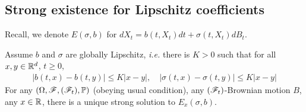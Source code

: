 \documentclass[10pt,a4paper]{article}
\begin{document}
\subsection{Strong existence for Lipschitz coefficients}

Recall, we denote $E(\sigma, b)$ for $dX_t = b(t, X_t) dt + \sigma(t, X_t) dB_t$.
\s

\thm Assume $b$ and $\sigma$ are globally Lipschitz, \textit{i.e.} there is $K>0$ such that for all $x,y\in \mathbb{R}^d$, $t\geq 0$,
\begin{align*}
|b(t, x)- b(t,y)| \leq K|x-y|, \quad |\sigma(t,x) - \sigma(t,y)| \leq K|x-y|
\end{align*}
For any $(\Omega, \mathscr{F}, (\mathscr{F}_t), \mathbb{P})$ (obeying usual condition), any $(\mathscr{F}_t)$-Brownian motion $B$, any $x\in \mathbb{R}$, there is a unique strong solution to $E_x(\sigma, b)$.
\end{document}
